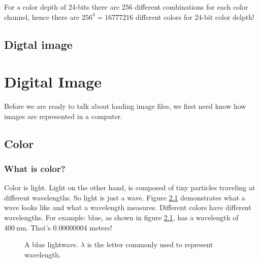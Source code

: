For a color depth of 24-bits there are 256 different combinations for
each color channel, hence there are $256^3 = 16777216$ different
colors for 24-bit color delpth! %


\section{Digtal image}
\label{sec:digtal-image}

\cite{ohlsson99:_digit_bild_kreat}



\printbibliography[heading=subbibliography]\begin{comment}
  
\end{comment}

\chapter{Digital Image}
\label{cha:digital-image}

Before we are ready to talk about loading image files, we first need
know how images are represented in a computer.

\section{Color}
\label{sec:color}

\subsection{What is color?}
\label{sec:what-color}

\newcommand{\bluewave}{\ensuremath{\SI{400}{\nano\meter}}}

Color is light. Light on the other hand, is composed of tiny particles
traveling at different wavelengths. \cite{neider93:_openg_progr_guide}
So light is just a wave. Figure \ref{fig:wave} demonstrates what a
wave looks like and what a wavelength measures. Different colors have
different wavelengths. For example: blue, as shown in figure
\ref{fig:wave}, has a wavelength of
\bluewave. \cite{puglia00:_handbook_dig_proj} That's $0.00000004$
meters!

\begin{figure}[h!]
  \centering
  \caption{A blue lightwave. $\lambda$ is the letter commonly used to
    represent  wavelength.}
  \label{fig:wave}
\end{figure}

